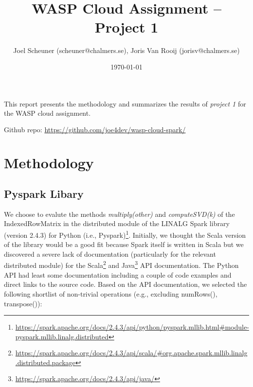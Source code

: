 \documentclass{prog_report}
\newcommand{\footurl}[1]{\footnote{\url{#1}}}
\begin{document}
\title{WASP Cloud Assignment – Project 1}

\author{Joel Scheuner (scheuner@chalmers.se), Joris Van Rooij (jorisv@chalmers.se)}

\date{\today}

\maketitle

%

This report presents the methodology and summarizes the results of \emph{project 1} for the WASP cloud assignment.

Github repo: \url{https://github.com/joe4dev/wasp-cloud-spark/}

\section{Methodology}

\subsection{Pyspark Libary}
We choose to evalute the methods \emph{multiply(other)} and \emph{computeSVD(k)} of the IndexedRowMatrix in the distributed module of the LINALG Spark library (version 2.4.3) for Python (i.e., Pyspark)\footurl{https://spark.apache.org/docs/2.4.3/api/python/pyspark.mllib.html\#module-pyspark.mllib.linalg.distributed}.
Initially, we thought the Scala version of the library would be a good fit because Spark itself is written in Scala but we discovered a severe lack of documentation (particularly for the relevant distributed module) for the Scala\footurl{https://spark.apache.org/docs/2.4.3/api/scala/\#org.apache.spark.mllib.linalg.distributed.package} and Java\footurl{https://spark.apache.org/docs/2.4.3/api/java/} API documentation.
The Python API had least some documentation including a couple of code examples and direct links to the source code.
Based on the API documentation, we selected the following shortlist of non-trivial operations (e.g., excluding numRows(), transpose()):
\end{document}
